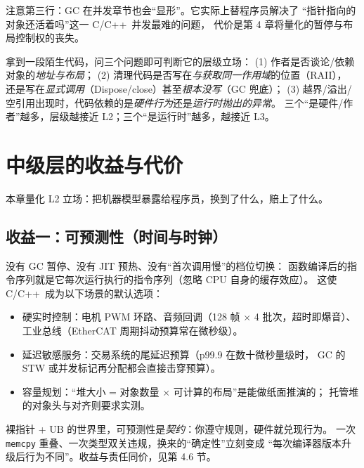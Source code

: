 \documentclass[12pt,a4paper,fontset=fandol]{ctexbook}
\newcommand{\Cplus}[1]{C++\,#1}
\begin{document}
注意第三行：GC 在并发章节也会``显形''。它实际上替程序员解决了
``指针指向的对象还活着吗''这一 C/\allowbreak{}\Cplus{} 并发最难的问题，
代价是第 4 章将量化的暂停与布局控制权的丧失。

\begin{levelspectrum}[title=层级显形的判读法]
拿到一段陌生代码，问三个问题即可判断它的层级立场：
(1) 作者是否谈论/依赖对象的\emph{地址与布局}；
(2) 清理代码是否写在\emph{与获取同一作用域}的位置（RAII），
    还是写在\emph{显式调用}（Dispose/close）甚至\emph{根本没写}（GC 兜底）；
(3) 越界/溢出/空引用出现时，代码依赖的是\emph{硬件行为}还是\emph{运行时抛出的异常}。
三个``是硬件/作者''越多，层级越接近 L2；三个``是运行时''越多，越接近 L3。
\end{levelspectrum}

\chapter{中级层的收益与代价}

本章量化 L2 立场：把机器模型暴露给程序员，换到了什么，赔上了什么。

\section{收益一：可预测性（时间与时钟）}

没有 GC 暂停、没有 JIT 预热、没有``首次调用慢''的档位切换：
函数编译后的指令序列就是它每次运行执行的指令序列（忽略 CPU 自身的缓存效应）。
这使 C/\allowbreak{}\Cplus{} 成为以下场景的默认选项：

\begin{itemize}
  \item 硬实时控制：电机 PWM 环路、音频回调（128 帧 $\times$ 4 批次，超时即爆音）、
        工业总线（EtherCAT 周期抖动预算常在微秒级）。
  \item 延迟敏感服务：交易系统的尾延迟预算（p99.9 在数十微秒量级时，
        GC 的 STW 或并发标记再分配都会直接击穿预算）。
  \item 容量规划：``堆大小 = 对象数量 $\times$ 可计算的布局''是能做纸面推演的；
        托管堆的对象头与对齐则要求实测。
\end{itemize}

\begin{note}[title=``可预测''的前提是程序员不滥用]
裸指针 + UB 的世界里，可预测性是\emph{契约}：你遵守规则，硬件就兑现行为。
一次 \texttt{memcpy} 重叠、一次类型双关违规，换来的``确定性''立刻变成
``每次编译器版本升级后行为不同''。收益与责任同价，见第 4.6 节。
\end{note}
\end{document}
